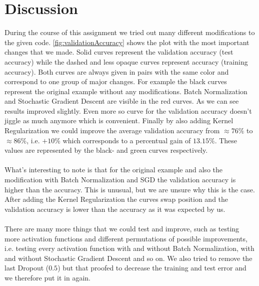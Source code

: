\documentclass{article}
\begin{document}
	\section{Discussion}
	\label{sec:Discussion}
	During the course of this assignment we tried out many different modifications to the given code. \autoref{fig:validationAccuracy} shows the plot with the most important changes that we made. Solid curves represent the validation accuracy (test accuracy) while the dashed and less opaque curves represent accuracy (training accuracy). Both curves are always given in pairs with the same color and correspond to one group of major changes. For example the black curves represent the original example without any modifications. Batch Normalization and Stochastic Gradient Descent are visible in the red curves. As we can see results improved slightly. Even more so curve for the validation accuracy doesn't jiggle as much anymore which is convenient. Finally by also adding Kernel Regularization we could improve the average validation accuracy from $\approx76\%$ to $\approx86\%$, i.e. $+10\%$ which corresponds to a percentual gain of $13.15\%$. These values are represented by the black- and green curves respectively. \\
	\\
	What's interesting to note is that for the original example and also the modification with Batch Normalization and SGD the validation accuracy is higher than the accuracy. This is unusual, but we are unsure why this is the case. After adding the Kernel Regularization the curves swap position and the validation accuracy is lower than the accuracy as it was expected by us. \\
	\\
	There are many more things that we could test and improve, such as testing more activation functions and different permutations of possible improvements, i.e. testing every activation function with and without Batch Normalization, with and without Stochastic Gradient Descent and so on. We also tried to remove the last Dropout ($0.5$) but that proofed to decrease the training and test error and we therefore put it in again. 

	
	
\end{document}

